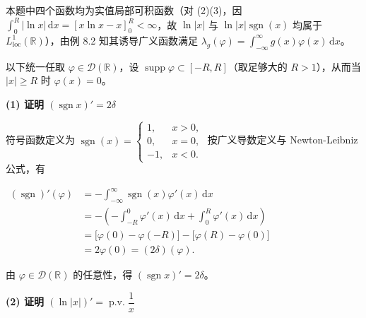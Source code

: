 \documentclass[11pt,a4paper]{article}
\newcommand{\SoftDivider}{%
  \par\vspace{5pt}\noindent\makebox[\linewidth][c]{\textcolor{BorderColor}{\rule{0.38\linewidth}{0.6pt}}}\par\vspace{5pt}%
}
\newcommand{\SubPillMain}[1]{%
  \Needspace{4.5\baselineskip}\vspace{5.5pt}\noindent
  \tcbox[on line, colback=AccentMain, colframe=AccentMain, boxrule=0pt,
    arc=3.5pt, left=6pt, right=6pt, top=2pt, bottom=2pt]{\small\bfseries\color{white}#1}%
  \par\vspace{3pt}%
}
\newcommand{\FitDisplayMath}[1]{%
  \par\vspace{4.5pt}\noindent
  \begin{adjustbox}{max width=\linewidth, center}
    $\displaystyle #1$
  \end{adjustbox}
  \par\vspace{4.5pt}%
}
\begin{document}
\SubPillMain{【规范解答】}

本题中四个函数均为实值局部可积函数（对 (2)(3)，因 \(\int_0^R |\ln x|\,\mathrm{d}x = [x\ln x - x]_0^R < \infty\)，故 \(\ln|x|\) 与 \(\ln|x|\operatorname{sgn}(x)\) 均属于 \(L^1_{\mathrm{loc}}(\mathbb{R})\)），由例 8.2 知其诱导广义函数满足 \(\lambda_g(\varphi) = \int_{-\infty}^{\infty} g(x)\varphi(x)\,\mathrm{d}x\)。

以下统一任取 \(\varphi \in \mathcal{D}(\mathbb{R})\)，设 \(\operatorname{supp}\varphi \subset [-R, R]\)（取足够大的 \(R > 1\)），从而当 \(|x| \ge R\) 时 \(\varphi(x) = 0\)。

\SoftDivider

\textbf{(1) 证明 \((\operatorname{sgn} x)' = 2\delta\)}

符号函数定义为 \(\operatorname{sgn}(x) = \begin{cases} 1, & x > 0, \\ 0, & x = 0, \\ -1, & x < 0. \end{cases}\) 按广义导数定义与 Newton-Leibniz 公式，有 
\FitDisplayMath{\begin{aligned}
(\operatorname{sgn})'(\varphi) &= -\int_{-\infty}^{\infty}\operatorname{sgn}(x)\varphi'(x)\,\mathrm{d}x \\
&= -\left(-\int_{-R}^{0}\varphi'(x)\,\mathrm{d}x + \int_{0}^{R}\varphi'(x)\,\mathrm{d}x\right) \\
&= \big[\varphi(0) - \varphi(-R)\big] - \big[\varphi(R) - \varphi(0)\big] \\
&= 2\varphi(0) = (2\delta)(\varphi).
\end{aligned}}
 由 \(\varphi \in \mathcal{D}(\mathbb{R})\) 的任意性，得 \((\operatorname{sgn} x)' = 2\delta\)。

\SoftDivider

\textbf{(2) 证明 \((\ln|x|)' = \operatorname{p.v.}\dfrac{1}{x}\)}
\end{document}

